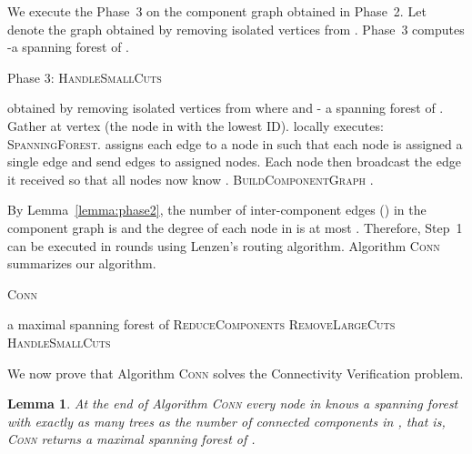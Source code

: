 \documentclass[11pt]{article}
\newtheorem{lemma}[theorem]{Lemma}
\begin{document}
\noindent We execute the Phase~3 on the component graph  obtained in Phase~2.  
Let  denote the graph obtained by removing isolated vertices from . 
Phase~3 computes  -a spanning forest of . 
\begin{algorithm}[H]
  \caption{Phase 3: \textsc{HandleSmallCuts}}
  \begin{algorithmic}[1]
    \REQUIRE  obtained by removing isolated vertices from  where  and 
    \ENSURE   - a spanning forest of .
    \STATE   Gather  at vertex  (the node in  with the lowest ID).
    \STATE    locally executes:  \textsc{SpanningForest}.  
    \STATE    assigns each edge to a node in  such that each node is assigned a single edge and send edges to assigned nodes.  
	    Each node then broadcast the edge it received so that all nodes now know .
    \STATE    \textsc{BuildComponentGraph}
    \RETURN  . 
  \end{algorithmic}
\end{algorithm}
By Lemma~\ref{lemma:phase2}, the number of inter-component edges () in the component graph  is  and the degree of each node in  is at most . 
Therefore, Step~1 can be executed in  rounds using Lenzen's routing algorithm.
Algorithm \textsc{Conn} summarizes our algorithm. 
\begin{algorithm}[H]
  \caption{\textsc{Conn}\label{algo:conn}}
  \begin{algorithmic}[1]
    \REQUIRE 
    \ENSURE  a maximal spanning forest of 
    \STATE    \textsc{ReduceComponents}
    \STATE    \textsc{RemoveLargeCuts} 
    \STATE    \textsc{HandleSmallCuts}
    \RETURN  
  \end{algorithmic}
\end{algorithm}
\noindent We now prove that Algorithm \textsc{Conn} solves the Connectivity Verification problem. 
\begin{lemma}
   At the end of Algorithm \textsc{Conn} every node in  knows a spanning forest with exactly as many trees as the number of connected components in , that is, \textsc{Conn} returns a maximal spanning forest of .
\end{lemma}
\end{document}
